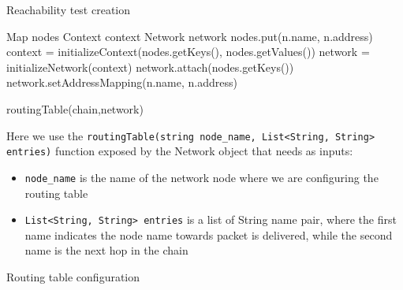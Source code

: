 \begin{algorithm}[H]
	\caption{Reachability test creation}
	\begin{algorithmic}[1]
		 {}
		\State Map nodes
		\State Context context
		\State Network network
			\State nodes.put(n.name, n.address)
		\EndFor
		\State context = initializeContext(nodes.getKeys(), nodes.getValues()) 
		\State network = initializeNetwork(context) 
		\State network.attach(nodes.getKeys())
			\State network.setAddressMapping(n.name, n.address)
			\EndIf
		\EndFor
										
%
		\State routingTable(chain,network)
		\EndProcedure
	\end{algorithmic}
\end{algorithm}

Here we use the \texttt{routingTable(string node\_name, List<String, String> entries)} function exposed by the Network object that needs as inputs:
\begin{itemize}
	\item \texttt{node\_name} is the name of the network node where we are configuring the routing table
	\item \texttt{List<String, String> entries} is a list of String name pair, where the first name indicates the node name towards packet is delivered, while the second name is the next hop in the chain
\end{itemize}
\begin{algorithm}[H]
	\caption{Routing table configuration}
	\begin{algorithmic}[1]
		 {}
					\EndIf
				\EndIf
			\EndFor
		\EndFor
		\EndProcedure
	\end{algorithmic}
\end{algorithm}
